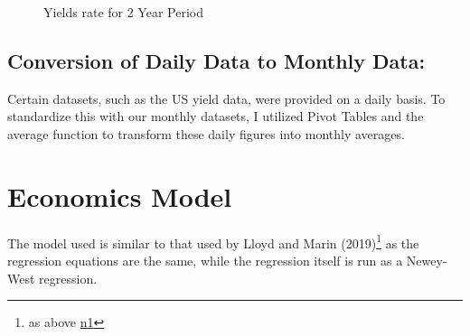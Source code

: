 \documentclass[10pt]{article}
\begin{document}
\begin{figure}[H]
    \centering
    \caption{{Yields rate for 2 Year Period}}
    \label{Yields20}
\end{figure}

\subsection{Conversion of Daily Data to Monthly Data:}

Certain datasets, such as the US yield data, were provided on a daily basis. To standardize this with our monthly datasets, I utilized Pivot Tables and the average function to transform these daily figures into monthly averages.

\section{Economics Model}
The model used is similar to that used by Lloyd and Marin (2019)\footnote{as above \hyperref[lloyd2020exchange]{n1}} as the regression equations are the same, while the regression itself is run as a Newey-West regression. 
\end{document}
